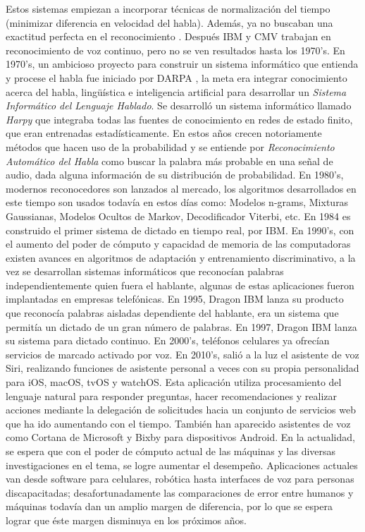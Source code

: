 \par
Estos sistemas empiezan a incorporar técnicas de normalización del tiempo (minimizar diferencia en velocidad del habla). Además, ya no buscaban una exactitud perfecta en el reconocimiento \citep{manfred}. Después IBM y CMV trabajan en reconocimiento de voz continuo, pero no se ven resultados hasta los 1970’s.
\vskip 0.5cm
En 1970’s, un ambicioso proyecto para construir un sistema informático que entienda y procese el habla fue iniciado por DARPA \citep{frederick}, la meta era integrar conocimiento acerca del habla, lingüística e inteligencia artificial para desarrollar un \textit{Sistema Informático del Lenguaje Hablado}. Se desarrolló un sistema informático llamado \textit{Harpy} que integraba todas las fuentes de conocimiento en redes de estado finito, que eran entrenadas estadísticamente. En estos años crecen notoriamente métodos que hacen uso de la probabilidad y se entiende por \textit{Reconocimiento Automático del Habla} como buscar la palabra más probable en una señal de audio, dada alguna información de su distribución de probabilidad.
\vskip 0.5cm
En 1980’s, modernos reconocedores son lanzados al mercado, los algoritmos desarrollados en este tiempo son usados todavía en estos días como: Modelos n-grams, Mixturas Gaussianas, Modelos Ocultos de Markov, Decodificador Viterbi, etc. En 1984 es construido el primer sistema de dictado en tiempo real, por IBM.
\vskip 0.5cm
En 1990’s, con el aumento del poder de cómputo y capacidad de memoria de las computadoras existen avances en algoritmos de adaptación y entrenamiento discriminativo, a la vez se desarrollan sistemas informáticos que reconocían palabras independientemente quien fuera el hablante, algunas de estas aplicaciones fueron implantadas en empresas telefónicas. En 1995, Dragon IBM lanza su producto que reconocía palabras aisladas dependiente del hablante, era un sistema que permitía un dictado de un gran número de palabras. En 1997, Dragon IBM lanza su sistema para dictado continuo. En 2000’s, teléfonos celulares ya ofrecían servicios de marcado activado por voz.
\vskip 0.5cm
En 2010’s, \cite{timetoast2010} salió a la luz el asistente de voz Siri, realizando funciones de asistente personal a veces con su propia personalidad para iOS, macOS, tvOS y watchOS. Esta aplicación utiliza procesamiento del lenguaje natural para responder preguntas, hacer recomendaciones y realizar acciones mediante la delegación de solicitudes hacia un conjunto de servicios web que ha ido aumentando con el tiempo. También han aparecido asistentes de voz como Cortana de Microsoft y Bixby para dispositivos Android.
\vskip 0.5cm
En la actualidad, se espera que con el poder de cómputo actual de las máquinas y las diversas investigaciones en el tema, se logre aumentar el desempeño. Aplicaciones actuales van desde software para celulares, robótica hasta interfaces de voz para personas discapacitadas; desafortunadamente las comparaciones de error entre humanos y máquinas todavía dan un amplio margen de diferencia, por lo que se espera lograr que éste margen disminuya en los próximos años.


